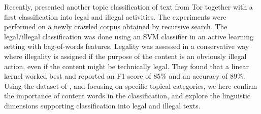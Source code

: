 \documentclass[11pt,a4paper,table]{article}
\begin{document}
Recently, \citet{Avarikioti18} presented another topic classification of text from Tor together with a first classification into legal and illegal activities.  The experiments were performed on a newly crawled corpus obtained by recursive search. The legal/illegal classification was done using an SVM classifier in an active learning setting with bag-of-words features. Legality was assessed in a conservative way where illegality is assigned if the purpose of the content is an obviously illegal action, even if the content might be technically legal. They found that a linear kernel worked best and reported an F1 score of 85\% and an accuracy of 89\%. Using the dataset of \citet{AlNabki19}, and focusing on specific topical categories, we here confirm the importance of content words in the classification, and explore the linguistic dimensions supporting classification into legal and illegal texts. 
\end{document}
